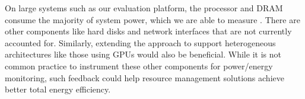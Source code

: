 On large systems such as our evaluation platform, the processor and DRAM consume the majority of system power, which we are able to measure \cite{RAPL,PCMGit}.
There are other components like hard disks and network interfaces that are not currently accounted for.
Similarly, extending the approach to support heterogeneous architectures like those using GPUs would also be beneficial.
While it is not common practice to instrument these other components for power/energy monitoring, such feedback could help resource management solutions achieve better total energy efficiency.
